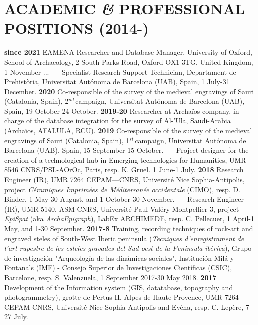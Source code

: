 \documentclass{article}
\begin{document}
\section{ACADEMIC \textit{\&} PROFESSIONAL POSITIONS (2014-)}

\textbf{since 2021 }EAMENA Researcher and Database Manager, University of Oxford, School of Archaeology, 2 South Parks Road, Oxford OX1 3TG, United Kingdom, 1 November-...
\smallbreak
\textbf{--- }Specialist Research Support Technician, Departament de Prehist\`oria, Universitat Aut\'{o}noma de Barcelona (UAB), Spain, 1 July-31 December.
\smallbreak
\textbf{2020 }Co-responsible of the survey of the medieval engravings of Sauri (Catalonia, Spain), 2${}^{nd\ }$campaign, Universitat Aut\'{o}noma de Barcelona (UAB), Spain, 19 October-24 October.
\smallbreak
\textbf{2019-20 }Researcher at Archa\"{i}os company, in charge of the database integration for the survey of Al-'Ula, Saudi-Arabia (Archa\"{i}os, AFALULA, RCU).
\smallbreak
\textbf{2019 }Co-responsible of the survey of the medieval engravings of Sauri (Catalonia, Spain), 1${}^{st\ }$campaign, Universitat Aut\'{o}noma de Barcelona (UAB), Spain, 15 September-15 October.
\smallbreak
\textbf{--- }Project designer for the creation of a technological hub in Emerging technologies for Humanities, UMR 8546 CNRS/PSL-AOrOc, Paris, resp. K. Gruel. 1 June-1 July.
\smallbreak
\textbf{2018 }Research Engineer (IR), UMR 7264 CEPAM---CNRS, Universit\'{e} Nice Sophia-Antipolis, project \textit{C\'{e}ramiques Imprim\'{e}es de M\'{e}diterran\'{e}e occidentale} (CIMO), resp. D. Binder, 1 May-30 August, and 1 October-30 November.
\smallbreak
\textbf{--- }Research Engineer (IR), UMR 5140, ASM-CNRS, Universit\'{e} Paul Val\'{e}ry Montpellier 3, project \textit{EpiSpat} (aka \textit{ArchaEpigraph}), LabEx ARCHIMEDE, resp. C. Pellecuer, 1 April-1 May, and 1-30 September.
\smallbreak
\textbf{2017-8 }Training, recording techniques of rock-art and engraved steles of South-West Iberic peninsula (\textit{Tecniques d'enregistrament de l'art rupestre de les esteles gravades del Sud-oest de la Peninsula ibèrica}), Grupo de investigaci\'{o}n "Arqueolog\'{i}a de las din\'{a}micas sociales", Instituci\'{o}n Mil\'{a} y Fontanals (IMF) - Consejo Superior de Investigaciones Cient\'{i}ficas (CSIC), Barcelone, resp. S. Valenzuela, 1 September 2017-30 May 2018.
\smallbreak
\textbf{2017 }Development of the Information system (GIS, datatabase, topography and photogrammetry), grotte de Pertus II, Alpes-de-Haute-Provence, UMR 7264 CEPAM-CNRS, Universit\'{e} Nice Sophia-Antipolis and Ev\'{e}ha, resp. C. Lep\`{e}re, 7-27 July.
\end{document}
